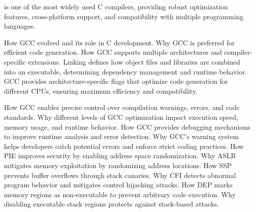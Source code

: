 \begin{NxSSSBox}
	\begin{NxIDBox}
		 is one of the most widely used C compilers, providing robust optimization features, cross-platform support, and compatibility with multiple programming languages.
	\end{NxIDBox}
	\begin{NxIDBoxL}
		 How GCC evolved and its role in C development.
		 Why GCC is preferred for efficient code generation.
		 How GCC supports multiple architectures and compiler-specific extensions.
		 Linking defines how object files and libraries are combined into an executable, determining dependency management and runtime behavior.
		 GCC provides architecture-specific flags that optimize code generation for different CPUs, ensuring maximum efficiency and compatibility.
	\end{NxIDBoxL}
\end{NxSSSBox}

\begin{NxSSSBox}[breakable]
	\begin{NxIDBoxL}
		 How GCC enables precise control over compilation warnings, errors, and code standards.
		 Why different levels of GCC optimization impact execution speed, memory usage, and runtime behavior.
		 How GCC provides debugging mechanisms to improve runtime analysis and error detection.
		 Why GCC’s warning system helps developers catch potential errors and enforce strict coding practices.
		 How PIE improves security by enabling address space randomization.
		 Why ASLR mitigates memory exploitation by randomizing address locations.
		 How SSP prevents buffer overflows through stack canaries.
		 Why CFI detects abnormal program behavior and mitigates control hijacking attacks.
		 How DEP marks memory regions as non-executable to prevent arbitrary code execution.
		 Why disabling executable stack regions protects against stack-based attacks.
	\end{NxIDBoxL}
\end{NxSSSBox}

